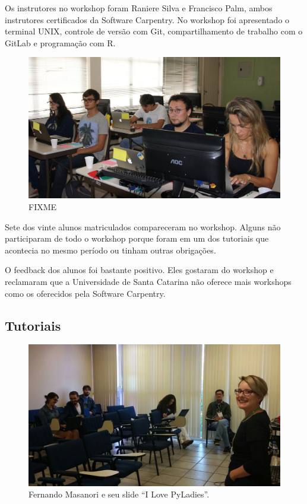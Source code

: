 \documentclass[12pt]{article}
\begin{document}
Os instrutores no workshop foram Raniere Silva e Francisco Palm,
ambos instrutores certificados da Software Carpentry.
No workshop foi apresentado o terminal UNIX, controle de versão com Git,
compartilhamento de trabalho com o GitLab e programação com R.

\noindent  %
\begin{figure}[!htb]
\center
\includegraphics[height=.3\textheight]{swc-students.jpg}
\caption{FIXME}
\end{figure}

Sete dos vinte alunos matriculados compareceram no workshop.
Alguns não participaram de todo o workshop porque foram em um dos tutoriais que
acontecia no mesmo período ou tinham outras obrigações.

O feedback dos alunos foi bastante positivo. Eles gostaram do workshop
e reclamaram que a Universidade de Santa Catarina não oferece mais workshops
como os oferecidos pela Software Carpentry.

\subsection*{Tutoriais}



\noindent  %
\begin{figure}[!htb]
\center
\includegraphics[height=.3\textheight]{tutorial-latex.jpg}
\caption{Fernando Masanori e seu slide ``I Love PyLadies''.}
\end{figure}
\end{document}
